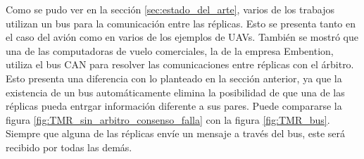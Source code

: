 Como se pudo ver en la sección \ref{sec:estado_del_arte}, varios de los trabajos utilizan un bus para la comunicación entre las réplicas. Esto se presenta tanto en el caso del avión como en varios de los ejemplos de UAVs. También se mostró que una de las computadoras de vuelo comerciales, la de la empresa Embention, utiliza el bus CAN para resolver las comunicaciones entre réplicas con el árbitro. %
Esto presenta una diferencia con lo planteado en la sección anterior, ya que la existencia de un bus automáticamente elimina la posibilidad de que una de las réplicas pueda entrgar información diferente a sus pares. Puede compararse la figura \ref{fig:TMR_sin_arbitro_consenso_falla} con la figura \ref{fig:TMR_bus}. Siempre que alguna de las réplicas envíe un mensaje a través del bus, este será recibido por todas las demás.




